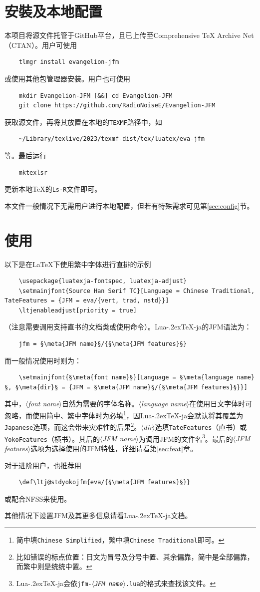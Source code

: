 \documentclass[twoside]{ltjsarticle}
\def\meta#1{{\normalfont\rmfamily\itshape$\langle$#1\/$\rangle$}}
\def\段{\par}
\def\LuaTeX{Lua\kern-.2ex\TeX}
\begin{document}
\section{安裝及本地配置}
本项目将源文件托管于GitHub平台，且已上传至Comprehensive \TeX{} Archive Net（CTAN）。用户可使用
\begin{lstlisting}
    tlmgr install evangelion-jfm
\end{lstlisting}
或使用其他包管理器安装。用户也可使用
\begin{lstlisting}
    mkdir Evangelion-JFM [&&] cd Evangelion-JFM
    git clone https://github.com/RadioNoiseE/Evangelion-JFM
\end{lstlisting}
获取源文件，再将其放置在本地的\texttt{TEXMF}路径中，如
\begin{lstlisting}
    ~/Library/texlive/2023/texmf-dist/tex/luatex/eva-jfm
\end{lstlisting}
等。最后运行
\begin{lstlisting}
    mktexlsr
\end{lstlisting}
更新本地\TeX{}的\texttt{Ls-R}文件即可。\段
本文件一般情况下无需用户进行本地配置，但若有特殊需求可见第\ref{sec:config}节。

\section{使用}
以下是在\LaTeX{}下使用繁中字体进行直排的示例
\begin{lstlisting}
    \usepackage{luatexja-fontspec, luatexja-adjust}
    \setmainjfont{Source Han Serif TC}[Language = Chinese Traditional, TateFeatures = {JFM = eva/{vert, trad, nstd}}]
    \ltjenableadjust[priority = true]
\end{lstlisting}
（注意需要调用支持直书的文档类或使用\texttt{\string\tate}命令）。\LuaTeX-ja的JFM语法为：
\begin{lstlisting}
    jfm = §\meta{JFM name}§/{§\meta{JFM features}§}
\end{lstlisting}
而一般情况使用\texttt{\string\setmainjfont}时则为：
\begin{lstlisting}
    \setmainjfont{§\meta{font name}§}[Language = §\meta{language name}§, §\meta{dir}§ = {JFM = §\meta{JFM name}§/{§\meta{JFM features}§}}]
\end{lstlisting}
其中，\meta{font name}自然为需要的字体名称。\meta{language name}在使用日文字体时可忽略，而使用简中、繁中字体时为必填\footnote{简中填\texttt{Chinese Simplified}，繁中填\texttt{Chinese Traditional}即可。}，因\LuaTeX-ja会默认将其覆盖为\texttt{Japanese}选项，而这会带来灾难性的后果\footnote{比如错误的标点位置：日文为冒号及分号中置、其余偏靠，简中是全部偏靠，而繁中则是统统中置。}。\meta{dir}选填\texttt{TateFeatures}（直书）或\texttt{YokoFeatures}（横书）。其后的\meta{JFM name}为调用JFM的文件名\footnote{\LuaTeX-ja会依\texttt{jfm-\meta{JFM name}.lua}的格式来查找该文件。}。最后的\meta{JFM features}选项为选择使用的JFM特性，详细请看第\ref{sec:feat}章。\段
对于进阶用户，也推荐用
\begin{lstlisting}
    \def\ltj@stdyokojfm{eva/{§\meta{JFM features}§}}
\end{lstlisting}
或配合NFSS来使用。\段
其他情况下设置JFM及其更多信息请看\LuaTeX-ja文档\cite{luatexja-doc}。
\end{document}
